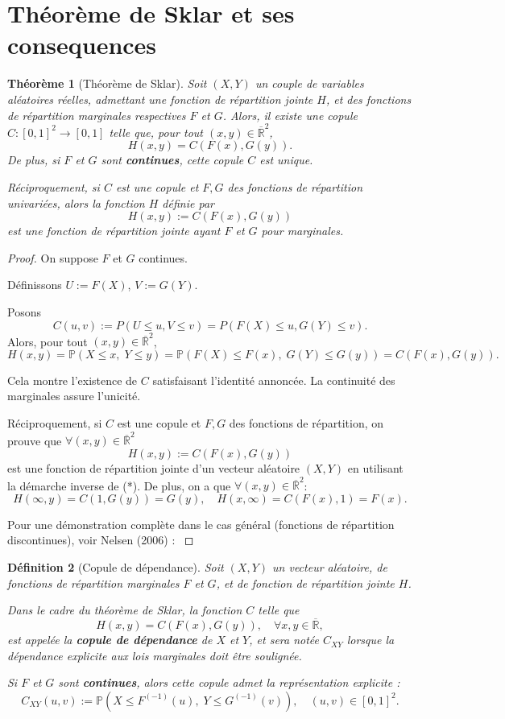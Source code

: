 \documentclass[a4paper,11pt]{amsbook}
\numberwithin{equation}{chapter}
\newtheorem{theoreme}			     {Théorème}	[chapter]
\newtheorem{definition}	[theoreme]   {Définition}
\theoremstyle{definition}
\begin{document}
\section{Théorème de Sklar et ses consequences}
\begin{theoreme}[Théorème de Sklar]\label{thm:sklar}
Soit \( (X, Y) \) un couple de variables aléatoires réelles, admettant une fonction de répartition jointe \( H \), et des fonctions de répartition marginales respectives \( F \) et \( G \). Alors, il existe une copule \( C : [0,1]^2 \to [0,1] \) telle que, pour tout \( (x,y) \in \overline{\mathbb{R}}^2 \),
\[
H(x, y) = C(F(x), G(y)).
\]
De plus, si \( F \) et \( G \) sont \textbf{continues}, cette copule \( C \) est unique.

Réciproquement, si \( C \) est une copule et \( F, G \) des fonctions de répartition univariées, alors la fonction \( H \) définie par
\[
H(x, y) := C(F(x), G(y))
\]
est une fonction de répartition jointe ayant \( F \) et \( G \) pour marginales.
\end{theoreme}

\begin{proof}
On suppose \( F \) et \( G \) continues.

Définissons \( U := F(X) \), \( V := G(Y) \).

Posons
\[
C(u,v) := P(U \leq u, V \leq v) = P(F(X) \leq u, G(Y) \leq v).
\]
Alors, pour tout \( (x,y) \in \overline{\mathbb{R}}^2 \),
\[
H(x, y) = \mathbb{P}(X \leq x,\; Y \leq y) 
= \mathbb{P}(F(X) \leq F(x),\; G(Y) \leq G(y)) 
= C(F(x), G(y)). \tag{*}
\]

Cela montre l'existence de \( C \) satisfaisant l'identité annoncée. La continuité des marginales assure l’unicité.

Réciproquement, si \( C \) est une copule et \( F, G \) des fonctions de répartition, on prouve que $\forall (x,y) \in \overline{\mathbb{R}}^2$
\[
H(x,y) := C(F(x), G(y))
\]
est une fonction de répartition jointe d'un vecteur aléatoire $(X,Y)$ en utilisant la démarche inverse de (*).
De plus, on a que $\forall (x,y) \in \overline{\mathbb{R}}^2$:
\[
H(\infty,y) = C(1, G(y)) = G(y), \quad H(x,\infty) = C(F(x), 1) = F(x).
\]

Pour une démonstration complète dans le cas général (fonctions de répartition discontinues), voir Nelsen (2006) :  \cite{nelsen}
\end{proof}
\begin{definition}[Copule de dépendance]\label{def:cop_dep}
Soit \( (X, Y) \) un vecteur aléatoire, de fonctions de répartition marginales \( F \) et \( G \), et de fonction de répartition jointe \( H \). 

Dans le cadre du théorème de Sklar, la fonction \( C \) telle que
\[
H(x, y) = C(F(x), G(y)), \quad \forall x, y \in \overline{\mathbb{R}},
\]
est appelée la \textbf{copule de dépendance} de \( X \) et \( Y \), et sera notée \( C_{XY} \) lorsque la dépendance explicite aux lois marginales doit être soulignée.

Si \( F \) et \( G \) sont \textbf{continues}, alors cette copule admet la représentation explicite :
\[
C_{XY}(u, v) := \mathbb{P}\left(X \leq F^{(-1)}(u),\; Y \leq G^{(-1)}(v)\right), \quad (u,v) \in [0,1]^2.
\]
\end{definition}
\end{document}
